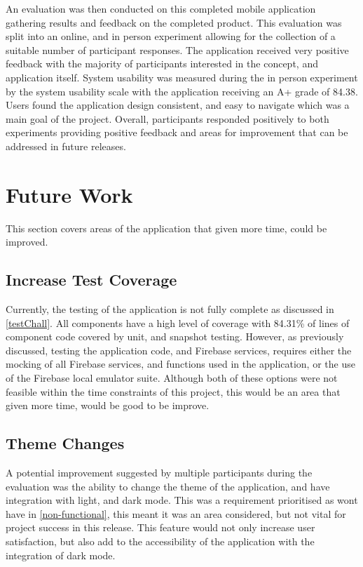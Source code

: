 An evaluation was then conducted on this completed mobile application gathering results and feedback on the completed product. This evaluation was split into an online, and in person experiment allowing for the collection of a suitable number of participant responses. The application received very positive feedback with the majority of participants interested in the concept, and application itself. System usability was measured during the in person experiment by the system usability scale with the application receiving an A+ grade of 84.38. Users found the application design consistent, and easy to navigate which was a main goal of the project. Overall, participants responded positively to both experiments providing positive feedback and areas for improvement that can be addressed in future releases.  


\section{Future Work}
This section covers areas of the application that given more time, could be improved.
\subsection*{Increase Test Coverage}
Currently, the testing of the application is not fully complete as discussed in \ref{testChall}. All components have a high level of coverage with 84.31\% of lines of component code covered by unit, and snapshot testing. However, as previously discussed, testing the application code, and Firebase services, requires either the mocking of all Firebase services, and functions used in the application, or the use of the Firebase local emulator suite. Although both of these options were not feasible within the time constraints of this project, this would be an area that given more time, would be good to be improve.  

\subsection*{Theme Changes}
A potential improvement suggested by multiple participants during the evaluation was the ability to change the theme of the application, and have integration with light, and dark mode. This was a requirement prioritised as wont have in \ref{non-functional}, this meant it was an area considered, but not vital for project success in this release. This feature would not only increase user satisfaction, but also add to the accessibility of the application with the integration of dark mode.

